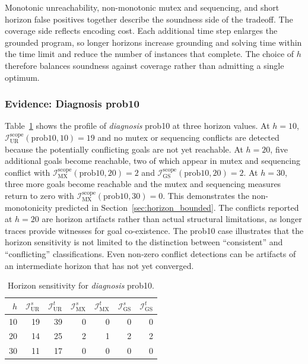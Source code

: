 Monotonic unreachability, non-monotonic mutex and sequencing, and short horizon false positives together describe the soundness side of the tradeoff. The coverage side reflects encoding cost. Each additional time step enlarges the grounded program, so longer horizons increase grounding and solving time within the time limit and reduce the number of instances that complete. The choice of $h$ therefore balances soundness against coverage rather than admitting a single optimum.

\subsubsection{Evidence: Diagnosis prob10}

Table~\ref{tab:horizon_diagnosis} shows the profile of \textit{diagnosis} prob10 at three horizon values. At $h = 10$, $\mathcal{I}^{\text{scope}}_{\text{UR}}(\text{prob10}, 10) = 19$ and no mutex or sequencing conflicts are detected because the potentially conflicting goals are not yet reachable. At $h = 20$, five additional goals become reachable, two of which appear in mutex and sequencing conflict with $\mathcal{I}^{\text{scope}}_{\text{MX}}(\text{prob10}, 20) = 2$ and $\mathcal{I}^{\text{scope}}_{\text{GS}}(\text{prob10}, 20) = 2$. At $h = 30$, three more goals become reachable and the mutex and sequencing measures return to zero with $\mathcal{I}^{\text{scope}}_{\text{MX}}(\text{prob10}, 30) = 0$. This demonstrates the non-monotonicity predicted in Section~\ref{sec:horizon_bounded}. The conflicts reported at $h = 20$ are horizon artifacts rather than actual structural limitations, as longer traces provide witnesses for goal co-existence. The prob10 case illustrates that the horizon sensitivity is not limited to the distinction between ``consistent'' and ``conflicting'' classifications. Even non-zero conflict detections can be artifacts of an intermediate horizon that has not yet converged.

\begin{table}[ht]
    \centering
    \begin{tabular}{r rr rr rr}
        \toprule
        $h$ & $\mathcal{I}^s_{\text{UR}}$ & $\mathcal{I}^t_{\text{UR}}$
            & $\mathcal{I}^s_{\text{MX}}$ & $\mathcal{I}^t_{\text{MX}}$
            & $\mathcal{I}^s_{\text{GS}}$ & $\mathcal{I}^t_{\text{GS}}$                 \\
        \midrule
        10  & 19                          & 39                          & 0 & 0 & 0 & 0 \\
        20  & 14                          & 25                          & 2 & 1 & 2 & 2 \\
        30  & 11                          & 17                          & 0 & 0 & 0 & 0 \\
        \bottomrule
    \end{tabular}
    \caption{Horizon sensitivity for \textit{diagnosis} prob10.}
    \label{tab:horizon_diagnosis}
\end{table}

